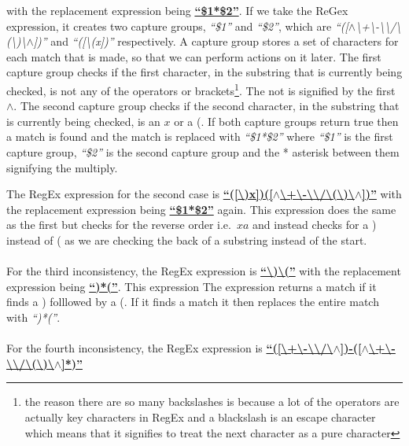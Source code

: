 \documentclass[../../../../../main.tex]{subfiles}
\begin{document}
with the replacement expression being \textbf{\underline{``\$1*\$2''}}. If we take the ReGex expression, it creates two capture groups, \textit{``\$1''} and \textit{``\$2''}, which are \textit{``([$\wedge$\textbackslash+\textbackslash-\textbackslash*\textbackslash/\textbackslash(\textbackslash)\textbackslash$\wedge$])''} and \textit{``([\textbackslash(x])''} respectively. A capture group stores a set of characters for each match that is made, so that we can perform actions on it later. The first capture group checks if the first character, in the substring that is currently being checked, is not any of the operators or brackets\footnote{the reason there are so many backslashes is because a lot of the operators are actually key characters in RegEx and a blackslash is an escape character which means that it signifies to treat the next character as a pure character}. The not is signified by the first $\wedge$. The second capture group checks if the second character, in the substring that is currently being checked, is an $x$ or a (. If both capture groups return true then a match is found and the match is replaced with \textit{``\$1*\$2''} where \textit{``\$1''} is the first capture group, \textit{``\$2''} is the second capture group and the * asterisk between them signifying the multiply.\par
The RegEx expression for the second case is
\textbf{\underline{``([\textbackslash)x])([$\wedge$\textbackslash+\textbackslash-\textbackslash*\textbackslash/\textbackslash(\textbackslash)\textbackslash$\wedge$])''}}
with the replacement expression being \textbf{\underline{``\$1*\$2''}} again. This expression does the same as the first but checks for the reverse order i.e.\ $xa$ and instead checks for a ) instead of ( as we are checking the back of a substring instead of the start.\\ \\
For the third inconsistency, the RegEx expression is
\textbf{\underline{``\textbackslash)\textbackslash(''}}
with the replacement expression being \textbf{\underline{``)*(''}}. This expression The expression returns a match if it finds a ) folllowed by a (. If it finds a match it then replaces the entire match with \textit{``)*(''}.\\ \\
For the fourth inconsistency, the RegEx expression is
\textbf{\underline{``([\textbackslash+\textbackslash-\textbackslash*\textbackslash/\textbackslash$\wedge$])-([$\wedge$\textbackslash+\textbackslash-\textbackslash*\textbackslash/\textbackslash(\textbackslash)\textbackslash$\wedge$]*)''}}
\end{document}
